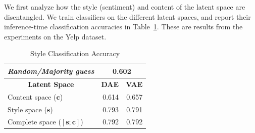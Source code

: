 \documentclass[letterpaper]{article} %
\newcommand{\tabh}[1]{\multicolumn{1}{c|}{\textbf{#1}}}
\newcommand{\tabc}[2]{\multicolumn{1}{|c||}{\multirow{#1}{*}{\textbf{#2}}}}
\begin{document}
We first analyze how the style (sentiment) and content of the latent space are disentangled. We train classifiers on the different latent spaces, and report their inference-time classification accuracies in Table~\ref{tab:classification}. These are results from the experiments on the Yelp dataset.

\begin{table}[ht]
	\centering
	\begin{tabular}{| l || r | r |}
		\hline
		\textit{Random/Majority guess}   & \multicolumn{2}{c|}{0.602}              \\ \hline \hline
		\hline
		\tabc{1}{Latent Space}           & \tabh{DAE}                 & \tabh{VAE} \\
		\hline \hline
		Content space  ($\bm c$)         & 0.614                      & 0.657      \\ \hline
		Style space ($\bm s$)            & 0.793                      & 0.791      \\ \hline
		Complete space ($[\bm s;\bm c]$) & 0.792                      & 0.792      \\
		\hline
	\end{tabular}
	\caption{Style Classification Accuracy}
	\label{tab:classification}
\end{table}
\end{document}
